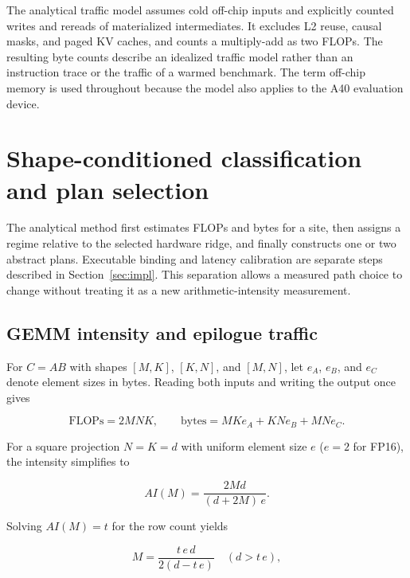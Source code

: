 \documentclass[a4paper,fleqn]{cas-dc}
\begin{document}
The analytical traffic model assumes cold off-chip inputs and explicitly counted writes and rereads of materialized intermediates.
It excludes L2 reuse, causal masks, and paged KV caches, and counts a multiply-add as two FLOPs.
The resulting byte counts describe an idealized traffic model rather than an instruction trace or the traffic of a warmed benchmark.
The term off-chip memory is used throughout because the model also applies to the A40 evaluation device.

\section{Shape-conditioned classification and plan selection}
\label{sec:method}

The analytical method first estimates FLOPs and bytes for a site, then assigns a regime relative to the selected hardware ridge, and finally constructs one or two abstract plans.
Executable binding and latency calibration are separate steps described in Section~\ref{sec:impl}.
This separation allows a measured path choice to change without treating it as a new arithmetic-intensity measurement.

\subsection{GEMM intensity and epilogue traffic}
\label{sec:gemm-ai}

For $C{=}AB$ with shapes $[M,K]$, $[K,N]$, and $[M,N]$, let $e_A$, $e_B$, and $e_C$ denote element sizes in bytes.
Reading both inputs and writing the output once gives

\begin{equation}
  \mathrm{FLOPs} = 2MNK, \qquad
  \mathrm{bytes} = MK e_A + KN e_B + MN e_C.
  \label{eq:gemm}
\end{equation}

For a square projection $N{=}K{=}d$ with uniform element size $e$ ($e{=}2$ for FP16), the intensity simplifies to

\begin{equation}
  AI(M) = \frac{2Md}{(d + 2M)\,e}.
  \label{eq:square}
\end{equation}

Solving $AI(M){=}t$ for the row count yields

\begin{equation}
  M = \frac{t\, e\, d}{2(d - t\, e)} \quad (d > t\, e),
  \label{eq:mstar}
\end{equation}
\end{document}
